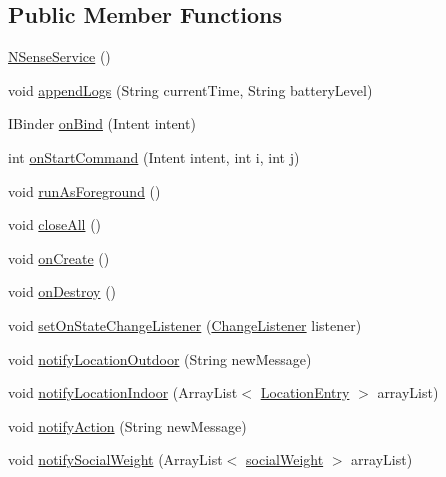 \subsection*{Public Member Functions}
\begin{DoxyCompactItemize}
\item 
\hyperlink{classcs_1_1nsense_1_1_n_sense_service_ab5ecb976350e80cf9a6dd611e25f70a7}{N\-Sense\-Service} ()
\item 
void \hyperlink{classcs_1_1nsense_1_1_n_sense_service_acd9b93ff8338610cf3b5c0957400395d}{append\-Logs} (String current\-Time, String battery\-Level)
\item 
I\-Binder \hyperlink{classcs_1_1nsense_1_1_n_sense_service_a43defc5d9d914e46d92c56a5c7dbc713}{on\-Bind} (Intent intent)
\item 
int \hyperlink{classcs_1_1nsense_1_1_n_sense_service_afd2ae520f80aa8a965d652ea03b38c1a}{on\-Start\-Command} (Intent intent, int i, int j)
\item 
void \hyperlink{classcs_1_1nsense_1_1_n_sense_service_aba5f7c269a7d1df571470722af5fbfa1}{run\-As\-Foreground} ()
\item 
void \hyperlink{classcs_1_1nsense_1_1_n_sense_service_aab4075731341a508e2a89ac8712476fb}{close\-All} ()
\item 
void \hyperlink{classcs_1_1nsense_1_1_n_sense_service_a280ca7655d1475fb045ffb8c8a1f20da}{on\-Create} ()
\item 
void \hyperlink{classcs_1_1nsense_1_1_n_sense_service_a38f4b1d79bd5999ed484ec065c44d7b6}{on\-Destroy} ()
\item 
void \hyperlink{classcs_1_1nsense_1_1_n_sense_service_ab950503639cad4608f3cf878e753ac78}{set\-On\-State\-Change\-Listener} (\hyperlink{interfacecs_1_1nsense_1_1_change_listener}{Change\-Listener} listener)
\item 
void \hyperlink{classcs_1_1nsense_1_1_n_sense_service_a024d56939e5311aba50221691a9e4ad7}{notify\-Location\-Outdoor} (String new\-Message)
\item 
void \hyperlink{classcs_1_1nsense_1_1_n_sense_service_a39bd59cefd3a882f1af6b3ed8b533f9e}{notify\-Location\-Indoor} (Array\-List$<$ \hyperlink{classcs_1_1nsense_1_1location_1_1_location_entry}{Location\-Entry} $>$ array\-List)
\item 
void \hyperlink{classcs_1_1nsense_1_1_n_sense_service_ac9028fc29acf5a6ace5d1cee92888427}{notify\-Action} (String new\-Message)
\item 
void \hyperlink{classcs_1_1nsense_1_1_n_sense_service_a55a56e24bc654791e331e0cdd6aab8b4}{notify\-Social\-Weight} (Array\-List$<$ \hyperlink{classcs_1_1nsense_1_1bluetooth_1_1_bluetooth_core_1_1social_weight}{social\-Weight} $>$ array\-List)

\end{DoxyCompactItemize}
